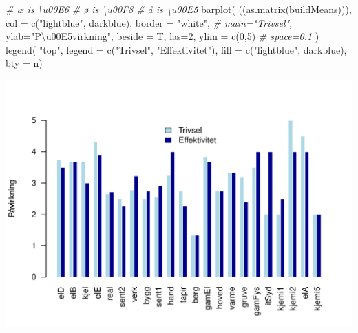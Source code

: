 \documentclass[
]{article}
\newenvironment{Shaded}{\begin{snugshade}}{\end{snugshade}}
\newcommand{\AttributeTok}[1]{\textcolor[rgb]{0.77,0.63,0.00}{#1}}
\newcommand{\CommentTok}[1]{\textcolor[rgb]{0.56,0.35,0.01}{\textit{#1}}}
\newcommand{\DecValTok}[1]{\textcolor[rgb]{0.00,0.00,0.81}{#1}}
\newcommand{\FunctionTok}[1]{\textcolor[rgb]{0.00,0.00,0.00}{#1}}
\newcommand{\NormalTok}[1]{#1}
\newcommand{\StringTok}[1]{\textcolor[rgb]{0.31,0.60,0.02}{#1}}
\begin{document}
\begin{Shaded}
\begin{Highlighting}[]
\CommentTok{\# æ is \textbackslash{}u00E6}
\CommentTok{\# ø is \textbackslash{}u00F8}
\CommentTok{\# å is \textbackslash{}u00E5}
\FunctionTok{barplot}\NormalTok{(}
\NormalTok{  ((}\FunctionTok{as.matrix}\NormalTok{(buildMeans))), }
  \AttributeTok{col =} \FunctionTok{c}\NormalTok{(}\StringTok{"lightblue"}\NormalTok{, }\StringTok{\textquotesingle{}darkblue\textquotesingle{}}\NormalTok{),}
  \AttributeTok{border =} \StringTok{"white"}\NormalTok{,}
  \CommentTok{\# main="Trivsel",}
  \AttributeTok{ylab=}\StringTok{"P\textbackslash{}u00E5virkning"}\NormalTok{,}
  \AttributeTok{beside =}\NormalTok{ T,}
  \AttributeTok{las=}\DecValTok{2}\NormalTok{,}
  \AttributeTok{ylim =} \FunctionTok{c}\NormalTok{(}\DecValTok{0}\NormalTok{,}\DecValTok{5}\NormalTok{)}
  \CommentTok{\# space=0.1}
\NormalTok{)}
\FunctionTok{legend}\NormalTok{(}
  \StringTok{"top"}\NormalTok{,}
  \AttributeTok{legend =} \FunctionTok{c}\NormalTok{(}\StringTok{"Trivsel"}\NormalTok{, }\StringTok{"Effektivitet"}\NormalTok{),}
  \AttributeTok{fill =} \FunctionTok{c}\NormalTok{(}\StringTok{"lightblue"}\NormalTok{, }\StringTok{\textquotesingle{}darkblue\textquotesingle{}}\NormalTok{), }\AttributeTok{bty =} \StringTok{\textquotesingle{}n\textquotesingle{}}\NormalTok{)}
\end{Highlighting}
\end{Shaded}

\begin{center}\includegraphics{noiseOnCampus_files/figure-latex/barplotResponses, options-1} \end{center}
\end{document}
